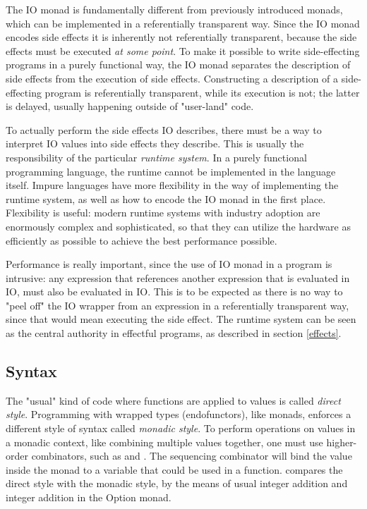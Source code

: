 

The IO monad is fundamentally different from previously introduced monads, which can be implemented in a referentially transparent way. Since the IO monad encodes side effects it is inherently not referentially transparent, because the side effects must be executed \textit{at some point}. To make it possible to write side-effecting programs in a purely functional way, the IO monad separates the description of side effects from the execution of side effects. Constructing a description of a side-effecting program is referentially transparent, while its execution is not; the latter is delayed, usually happening outside of "user-land" code.

To actually perform the side effects IO describes, there must be a way to interpret IO values into side effects they describe. This is usually the responsibility of the particular \textit{runtime system}. In a purely functional programming language, the runtime cannot be implemented in the language itself. Impure languages have more flexibility in the way of implementing the runtime system, as well as how to encode the IO monad in the first place. Flexibility is useful: modern runtime systems with industry adoption are enormously complex and sophisticated, so that they can utilize the hardware as efficiently as possible to achieve the best performance possible.

Performance is really important, since the use of IO monad in a program is intrusive: any expression that references another expression that is evaluated in IO, must also be evaluated in IO. This is to be expected as there is no way to "peel off" the IO wrapper from an expression in a referentially transparent way, since that would mean executing the side effect. The runtime system can be seen as the central authority in effectful programs, as described in section \ref{effects}.



\subsection{Syntax} \label{background:monad:syntax}
The "usual" kind of code where functions are applied to values is called \textit{direct style}. Programming with wrapped types (endofunctors), like monads, enforces a different style of syntax called \textit{monadic style}. To perform operations on values in a monadic context, like combining multiple values together, one must use higher-order combinators, such as  and . The sequencing combinator will bind the value inside the monad to a variable that could be used in a function.  compares the direct style with the monadic style, by the means of usual integer addition and integer addition in the Option monad.

